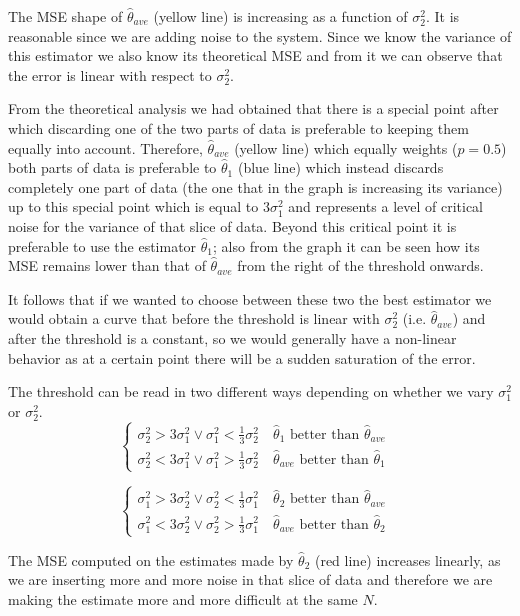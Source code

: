 The MSE shape of $\hat \theta_{ave}$ (yellow line) is increasing as a function of $\sigma^2_2$. It is reasonable since we are adding noise to the system. Since we know the variance of this estimator we also know its theoretical MSE and from it we can observe that the error is linear with respect to $\sigma_2^2$.

From the theoretical analysis we had obtained that there is a special point after which discarding one of the two parts of data is preferable to keeping them equally into account. Therefore, $\hat \theta_{ave}$ (yellow line) which equally weights ($p=0.5$) both parts of data is preferable to $\hat\theta_1$ (blue line) which instead discards completely one part of data (the one that in the graph is increasing its variance) up to this special point which is equal to $3\sigma_1^2$ and represents a level of critical noise for the variance of that slice of data. Beyond this critical point it is preferable to use the estimator $\hat \theta_1$; also from the graph it can be seen how its MSE remains lower than that of $\hat \theta_{ave}$ from the right of the threshold onwards.

It follows that if we wanted to choose between these two the best estimator we would obtain a curve that before the threshold is linear with $\sigma^2_2$ (i.e. $\hat \theta_{ave}$) and after the threshold is a constant, so we would generally have a non-linear behavior as at a certain point there will be a sudden saturation of the error.

The threshold can be read in two different ways depending on whether we vary $\sigma_1^2$ or $\sigma_2^2$.
\[
    \begin{cases}
        \sigma_2^2>3\sigma_1^2 \lor \sigma_1^2<\frac 13\sigma_2^2\quad\text{$\hat\theta_1$ better than $\hat \theta_{ave}$} \\
        \sigma_2^2<3\sigma_1^2\lor \sigma_1^2>\frac13\sigma_2^2\quad\text{$\hat \theta_{ave}$ better than $\hat \theta_1$ }
    \end{cases}
\]

\[
    \begin{cases}
        \sigma_1^2>3\sigma_2^2\lor \sigma_2^2<\frac 13\sigma_1^2\quad\text{$\hat\theta_2$ better than $\hat \theta_{ave}$} \\
        \sigma_1^2<3\sigma_2^2\lor \sigma_2^2>\frac13\sigma_1^2\quad\text{$\hat \theta_{ave}$ better than $\hat \theta_2$ }
    \end{cases}
\]

The MSE computed on the estimates made by $\hat \theta_2$ (red line) increases linearly, as we are inserting more and more noise in that slice of data and therefore we are making the estimate more and more difficult at the same $N$.

